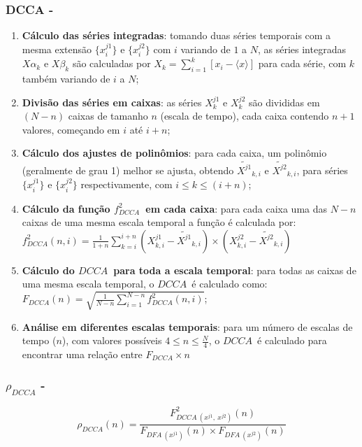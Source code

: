 \documentclass[11pt, aspectratio=169]{beamer}
\newcommand{\pdcca}{\({\rho}_{DCCA}\) }
\newcommand{\dcca}{$DCCA$}
\begin{document}
\begin{frame}[allowframebreaks]
\frametitle{DCCA - \cite{Podobnik2008}}
\begin{enumerate}
    \item \textbf{Cálculo das séries integradas}: tomando duas séries temporais com a mesma extensão $\{x^{j1}_{i}\}$ e $\{x^{j2}_{i}\}$ com $i$ variando de $1$ a $N$,
          as séries integradas $X\alpha_{k}$ e $X\beta_{k}$ são calculadas por
          $X_{k} = \sum_{i=1}^{k}\left[x_{i} - \langle x \rangle \right] $ para cada série, com $k$ também variando de $i$ a $N$;
    \item \textbf{Divisão das séries em caixas}: as séries $X^{j1}_{k}$ e $X^{j2}_{k}$ são divididas em $(N - n)$ caixas de tamanho $n$ (escala de tempo), cada caixa contendo $n + 1$ valores, começando em $i$ até $i + n$;
    \item \textbf{Cálculo dos ajustes de polinômios}: para cada caixa, um polinômio (geralmente de grau 1) melhor se ajusta, obtendo
          $\widetilde{X^{j1}}_{k, i}$ e $\widetilde{X^{j2}}_{k, i}$,
          para séries $\{x^{j1}_{i}\}$ e $\{x^{j2}_{i}\}$ respectivamente,
          com $i \le k \le (i + n)$;
    \item \textbf{Cálculo da função $f_{DCCA}^{2}$~em cada caixa}: para cada caixa uma das $N - n$ caixas de uma mesma escala temporal a função é calculada por:\\[10pt]
     $f_{DCCA}^{2}(n, i) =
            \frac{1}{1+n} \sum_{k=i}^{i + n}(X^{j1}_{k,i}-\widetilde{X^{j1}}_{k, i}) \times (X^{j2}_{k,i}-\widetilde{X^{j2}}_{k, i})$
    \item \textbf{Cálculo do \dcca~para toda a escala temporal}: para todas as caixas de uma mesma escala temporal, o \dcca~é calculado como:\\[10pt]
          $F_{DCCA}(n) = \sqrt{\frac{1}{N - n} \sum_{i=1}^{N-n} f_{DCCA}^{2}(n, i)}$;
    \item \textbf{Análise em diferentes escalas temporais}: para um número de escalas de tempo ($n$), com valores possíveis $4 \le n \le \frac{N}{4}$, o \dcca~é calculado para encontrar uma relação entre $F_{DCCA} \times n$

\end{enumerate}

\end{frame}

\begin{frame}
\frametitle{\pdcca - \cite{Zebende2011}}

\begin{equation}
  {\rho}_{DCCA}(n) = \frac{F_{DCCA~(x^{j1},~x^{j2})}^{2}(n)}
  {F_{DFA~(x^{j1})}(n) \times F_{DFA~(x^{j2})}(n)}
  \label{eq:p_dcca}
\end{equation}

\end{frame}
\end{document}

